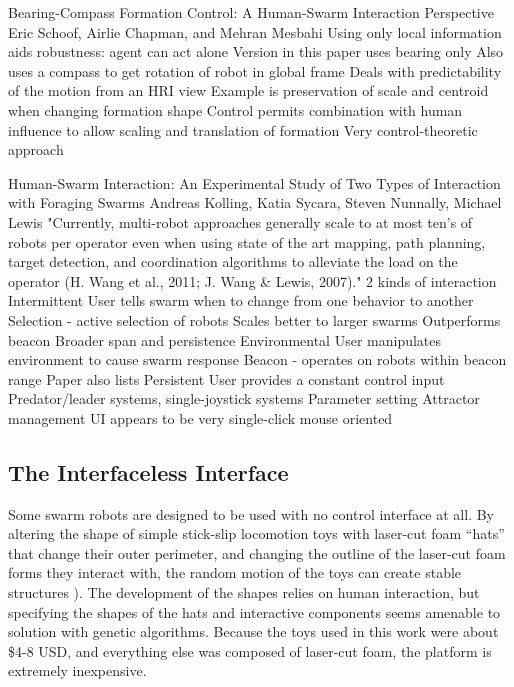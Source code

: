 \citep{schoof2014bearing}
Bearing-Compass Formation Control: A Human-Swarm Interaction Perspective
Eric Schoof, Airlie Chapman, and Mehran Mesbahi
	Using only local information aids robustness: agent can act alone
	Version in this paper uses bearing only
	Also uses a compass to get rotation of robot in global frame
	Deals with predictability of the motion from an HRI view
		Example is preservation of scale and centroid when changing formation shape
	Control permits combination with human influence to allow scaling and translation of formation
	Very control-theoretic approach

\citep{kolling2013human}
Human-Swarm Interaction: An Experimental Study of Two Types of Interaction with Foraging Swarms
Andreas Kolling, Katia Sycara, Steven Nunnally, Michael Lewis
	"Currently, multi-robot approaches generally scale to at most ten’s of robots per operator even when using state of the art mapping, path planning, target detection, and coordination algorithms to alleviate the load on the operator (H. Wang et al., 2011; J. Wang \& Lewis, 2007)."
	2 kinds of interaction
		Intermittent
			User tells swarm when to change from one behavior to another
			Selection - active selection of robots
				Scales better to larger swarms
				Outperforms beacon
					Broader span and persistence
		Environmental
			User manipulates environment to cause swarm response
			Beacon - operates on robots within beacon range
	Paper also lists
		Persistent
			User provides a constant control input
				Predator/leader systems, single-joystick systems
		Parameter setting
			Attractor management
	UI appears to be very single-click mouse oriented





\subsection{The Interfaceless Interface}	

Some swarm robots are designed to be used with no control interface at all.
By altering the shape of simple stick-slip locomotion toys with laser-cut foam ``hats'' that change their outer perimeter, and changing the outline of the laser-cut foam forms they interact with, the random motion of the toys can create stable structures \citep{andreen2016emergent}).
The development of the shapes relies on human interaction, but specifying the shapes of the hats and interactive components seems amenable to solution with genetic algorithms. 
Because the toys used in this work were about \$4-8 USD, and everything else was composed of laser-cut foam, the platform is extremely inexpensive. 

